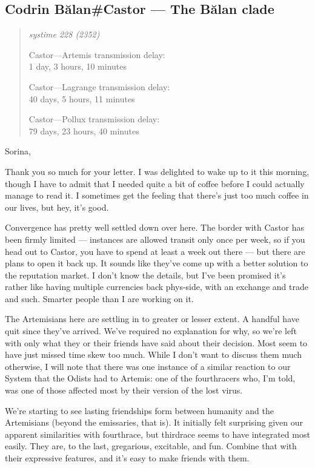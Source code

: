 \hypertarget{codrin-bux103lancastor-the-bux103lan-clade}{%
\subsection{Codrin Bălan\#Castor — The Bălan clade}\label{codrin-bux103lancastor-the-bux103lan-clade}}

\begin{quote}
\itshape
systime 228 (2352)

Castor---Artemis transmission delay:\\
1 day, 3 hours, 10 minutes

Castor---Lagrange transmission delay:\\
40 days, 5 hours, 11 minutes

Castor---Pollux transmission delay:\\
79 days, 23 hours, 40 minutes
\end{quote}

Sorina,

Thank you so much for your letter. I was delighted to wake up to it this morning, though I have to admit that I needed quite a bit of coffee before I could actually manage to read it. I sometimes get the feeling that there's just too much coffee in our lives, but hey, it's good.

Convergence has pretty well settled down over here. The border with Castor has been firmly limited — instances are allowed transit only once per week, so if you head out to Castor, you have to spend at least a week out there — but there are plans to open it back up. It sounds like they've come up with a better solution to the reputation market. I don't know the details, but I've been promised it's rather like having multiple currencies back phys-side, with an exchange and trade and such. Smarter people than I are working on it.

The Artemisians here are settling in to greater or lesser extent. A handful have quit since they've arrived. We've required no explanation for why, so we're left with only what they or their friends have said about their decision. Most seem to have just missed time skew too much. While I don't want to discuss them much otherwise, I will note that there was one instance of a similar reaction to our System that the Odists had to Artemis: one of the fourthracers who, I'm told, was one of those affected most by their version of the lost virus.

We're starting to see lasting friendships form between humanity and the Artemisians (beyond the emissaries, that is). It initially felt surprising given our apparent similarities with fourthrace, but thirdrace seems to have integrated most easily. They are, to the last, gregarious, excitable, and fun. Combine that with their expressive features, and it's easy to make friends with them.

